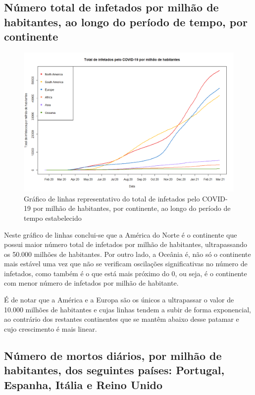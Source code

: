 \documentclass[conference]{IEEEtran}
\begin{document}
\subsection{Número total de infetados por milhão de habitantes, ao longo do período de tempo, por continente}

\begin{figure}[htbp]
\centerline{\includegraphics[width=0.95\columnwidth]{images/01.b.png}}
\caption{Gráfico de linhas representativo do total de infetados pelo COVID-19 por milhão de habitantes, por continente, ao longo do período de tempo estabelecido}
\label{fig}
\end{figure}

Neste gráfico de linhas conclui-se que a América do Norte é o continente que possui maior número total de infetados por milhão de habitantes, ultrapassando os 50.000 milhões de habitantes. Por outro lado, a Oceânia é, não só o continente mais estável uma vez que não se verificam oscilações significativas no número de infetados, como também é o que está mais próximo do 0, ou seja, é o continente com menor número de infetados por milhão de habitante.

É de notar que a América e a Europa são os únicos a ultrapassar o valor de 10.000 milhões de habitantes e cujas linhas tendem a subir de forma exponencial, ao contrário dos restantes continentes que se mantêm abaixo desse patamar e cujo crescimento é mais linear.


\subsection{Número de mortos diários, por milhão de habitantes, dos seguintes países: Portugal, Espanha, Itália e Reino Unido}
\end{document}

